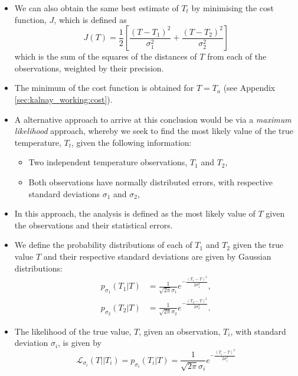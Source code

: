 \begin{itemize}
    \item We can also obtain the same best estimate of $T_t$ by minimising the cost function, $J$, which is defined as
    \begin{equation}
            J(T) = \frac{1}{2} \left[ \frac{\left( T - T_1 \right)^2}{\sigma_1^2} + \frac{\left( T - T_2 \right)^2}{\sigma_2^2} \right] \label{eq:cost_function}
    \end{equation}
    which is the sum of the squares of the distances of $T$ from each of the observations, weighted by their precision.
    \item The minimum of the cost function is obtained for $T = T_a$ (see Appendix \ref{sec:kalnay_working:cost}).
\end{itemize}
\begin{itemize}
    \item A alternative approach to arrive at this conclusion would be via a \emph{maximum likelihood} approach, whereby we seek to find the most likely value of the true temperature, $T_t$, given the following information:
    \begin{itemize}
        \item Two independent temperature observations, $T_1$ and $T_2$,
        \item Both observations have normally distributed errors, with respective standard deviations $\sigma_1$ and $\sigma_2$,
    \end{itemize}
    \item In this approach, the analysis is defined as the most likely value of $T$ given the observations and their statistical errors.
    \item We define the probability distributions of each of $T_1$ and $T_2$ given the true value $T$ and their respective standard deviations are given by Gaussian distributions:
    \begin{subequations}
        \begin{align}
            p_{\sigma_1} \left( T_1 | T \right) &= \frac{1}{\sqrt{2 \pi} \sigma_1} e^{-\frac{\left( T_1 - T \right)^2}{2 \sigma_1^2}}, \\
            p_{\sigma_2} \left( T_2 | T \right) &= \frac{1}{\sqrt{2 \pi} \sigma_2} e^{-\frac{\left( T_2 - T \right)^2}{2 \sigma_2^2}}.
        \end{align}
    \end{subequations}
    \item The likelihood of the true value, $T$, given an observation, $T_i$, with standard deviation $\sigma_i$, is given by
    \begin{equation}
        \mathcal{L}_{\sigma_i} \left( T || T_i \right) = 
            p_{\sigma_i} \left( T_i | T \right) =
            \frac{1}{\sqrt{2 \pi}\sigma_i} e^{-\frac{\left( T_i - T \right)^2}{2 \sigma_i^2}}
    \end{equation}
\end{itemize}

